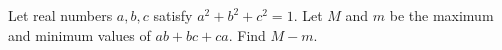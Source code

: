 Let real numbers $a,b,c$ satisfy $a^2+b^2+c^2=1$. Let $M$ and $m$ be the maximum and minimum values of $ab+bc+ca$. Find $M-m$.

